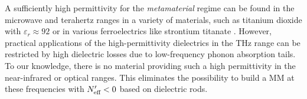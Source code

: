 A sufficiently high permittivity for the \textit{metamaterial} regime can be found in the microwave and terahertz ranges in a variety of materials, such as titanium dioxide with $\varepsilon_r \approx 92$ \cite{nemec2009tunable} or in various ferroelectrics like strontium titanate \cite{skoromets2011tuning}. However, practical applications of the high-permittivity dielectrics in the THz range can be restricted by high dielectric losses due to low-frequency phonon absorption tails. To our knowledge, there is no material providing such a high permittivity in the near-infrared or optical ranges. This eliminates the possibility to build a MM at these frequencies with $N_{\text{eff} }'<0$ based on dielectric rods.

\FloatBarrier %

